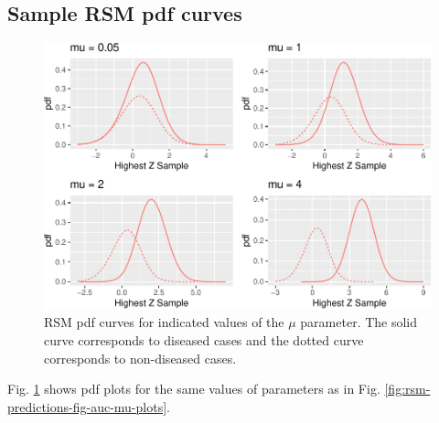 \documentclass[
]{book}
\begin{document}
\hypertarget{rsm-predictions-pdf-curves}{%
\subsection{Sample RSM pdf curves}\label{rsm-predictions-pdf-curves}}

\begin{figure}
\centering
\includegraphics{07-rsm-predictions_files/figure-latex/rsm-predictions-fig-pdf-mu-plots-1.pdf}
\caption{\label{fig:rsm-predictions-fig-pdf-mu-plots}RSM pdf curves for indicated values of the \(\mu\) parameter. The solid curve corresponds to diseased cases and the dotted curve corresponds to non-diseased cases.}
\end{figure}

Fig. \ref{fig:rsm-predictions-fig-pdf-mu-plots} shows pdf plots for the same values of parameters as in Fig. \ref{fig:rsm-predictions-fig-auc-mu-plots}.
\end{document}
